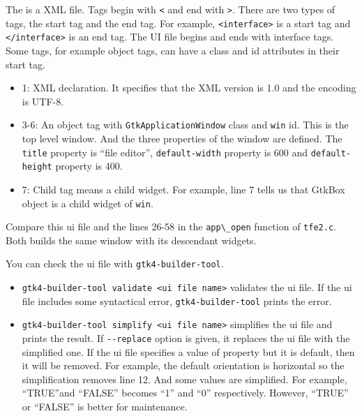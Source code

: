 The is a XML file. Tags begin with \passthrough{\lstinline!<!} and end
with \passthrough{\lstinline!>!}. There are two types of tags, the start
tag and the end tag. For example, \passthrough{\lstinline!<interface>!}
is a start tag and \passthrough{\lstinline!</interface>!} is an end tag.
The UI file begins and ends with interface tags. Some tags, for example
object tags, can have a class and id attributes in their start tag.

\begin{itemize}
\tightlist
\item
  1: XML declaration. It specifies that the XML version is 1.0 and the
  encoding is UTF-8.
\item
  3-6: An object tag with \passthrough{\lstinline!GtkApplicationWindow!}
  class and \passthrough{\lstinline!win!} id. This is the top level
  window. And the three properties of the window are defined. The
  \passthrough{\lstinline!title!} property is ``file editor'',
  \passthrough{\lstinline!default-width!} property is 600 and
  \passthrough{\lstinline!default-height!} property is 400.
\item
  7: Child tag means a child widget. For example, line 7 tells us that
  GtkBox object is a child widget of \passthrough{\lstinline!win!}.
\end{itemize}

Compare this ui file and the lines 26-58 in the
\passthrough{\lstinline!app\_open!} function of
\passthrough{\lstinline!tfe2.c!}. Both builds the same window with its
descendant widgets.

You can check the ui file with
\passthrough{\lstinline!gtk4-builder-tool!}.

\begin{itemize}
\tightlist
\item
  \passthrough{\lstinline!gtk4-builder-tool validate <ui file name>!}
  validates the ui file. If the ui file includes some syntactical error,
  \passthrough{\lstinline!gtk4-builder-tool!} prints the error.
\item
  \passthrough{\lstinline!gtk4-builder-tool simplify <ui file name>!}
  simplifies the ui file and prints the result. If
  \passthrough{\lstinline!--replace!} option is given, it replaces the
  ui file with the simplified one. If the ui file specifies a value of
  property but it is default, then it will be removed. For example, the
  default orientation is horizontal so the simplification removes line
  12. And some values are simplified. For example, ``TRUE''and ``FALSE''
  becomes ``1'' and ``0'' respectively. However, ``TRUE'' or ``FALSE''
  is better for maintenance.
\end{itemize}

